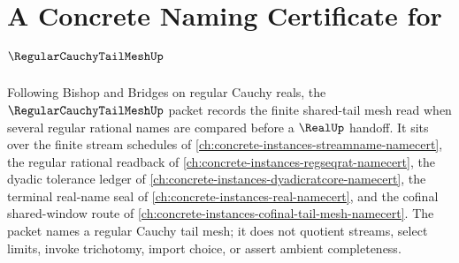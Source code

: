 \chapter{A Concrete Naming Certificate for $\RegularCauchyTailMeshUp$}
\label{ch:concrete-instances-regular-cauchy-tail-mesh-namecert}

Following Bishop and Bridges on regular Cauchy reals, the $\RegularCauchyTailMeshUp$ packet records the finite shared-tail mesh read when several regular rational names are compared before a $\RealUp$ handoff. It sits over the finite stream schedules of \autoref{ch:concrete-instances-streamname-namecert}, the regular rational readback of \autoref{ch:concrete-instances-regseqrat-namecert}, the dyadic tolerance ledger of \autoref{ch:concrete-instances-dyadicratcore-namecert}, the terminal real-name seal of \autoref{ch:concrete-instances-real-namecert}, and the cofinal shared-window route of \autoref{ch:concrete-instances-cofinal-tail-mesh-namecert}. The packet names a regular Cauchy tail mesh; it does not quotient streams, select limits, invoke trichotomy, import choice, or assert ambient completeness.

